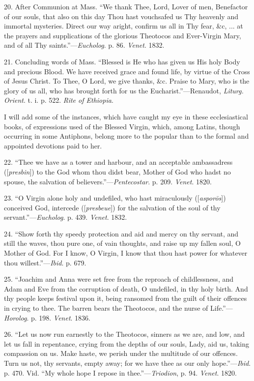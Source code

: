 20. After Communion at Mass. ``We thank Thee, Lord, Lover of men,
Benefactor of our souls, that also on this day Thou hast vouchsafed us
Thy heavenly and immortal mysteries. Direct our way aright, confirm us
all in Thy fear, \&c, ... at the prayers and supplications of the
glorious Theotocos and Ever-Virgin Mary, and of all Thy saints.''—\emph{Eucholog}.
p. 86. \emph{Venet}. 1832.


21. Concluding words of Mass. ``Blessed is He who has given us
His holy Body and precious Blood. We have received grace and found life,
by virtue of the Cross of Jesus Christ. To Thee, O Lord, we give thanks,
\&c. Praise to Mary, who is the glory of us all, who has brought
forth for us the Eucharist.''—Renaudot, \emph{Liturg. Orient}. t.
i. p. 522. \emph{Rite of Ethiopia}.


I will add some of the instances, which have caught my eye in these
ecclesiastical books, of expressions used of the Blessed Virgin, which,
among Latins, though occurring in some Antiphons, belong more to the
popular than to the formal and appointed devotions paid to her.


22. ``Thee we have as a tower and harbour, and an acceptable ambassadress ([\emph{presbin}]) to the God whom thou didst
bear, Mother of God who hadst no spouse, the salvation of
believers.''—\emph{Pentecostar}. p. 209. \emph{Venet}. 1820.


23. ``O Virgin alone holy and undefiled, who hast miraculously ([\emph{aspor\={o}s}])
conceived God, intercede ([\emph{presbeue}]) for the salvation of the
soul of thy servant.''—\emph{Eucholog}. p. 439. \emph{Venet}.
1832.


24. ``Show forth thy speedy protection and aid and mercy on thy
servant, and still the waves, thou pure one, of vain thoughts, and raise
up my fallen soul, O Mother of God. For I know, O Virgin, I know that
thou hast power for whatever thou willest.''—\emph{Ibid}. p. 679.


25. ``Joachim and Anna were set free from the reproach of
childlessness, and Adam and Eve from the corruption of death, O
undefiled, in thy holy birth. And thy people keeps festival upon it,
being ransomed from the guilt of their offences in crying to thee. The
barren bears the Theotocos, and the nurse of Life.''—\emph{Horolog}.
p. 198. \emph{Venet}. 1836.


26. ``Let us now run earnestly to the Theotocos, sinners as we
are, and low, and let us fall in repentance, crying from the depths of
our souls, Lady, aid us, taking compassion on us. Make haste, we perish
under the multitude of our offences. Turn us not, thy servants, empty
away; for we have thee as our only hope.''—\emph{Ibid}. p. 470.
Vid. ``My whole hope I repose in thee.''—\emph{Triodion}, p.
94. \emph{Venet}. 1820.



